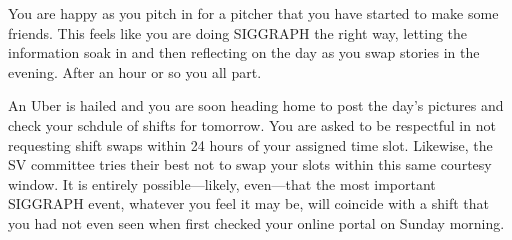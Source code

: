 \documentclass[../main.tex]{subfiles}
\begin{document}
You are happy as you pitch in for a pitcher that you have started to make some friends. This feels like you are doing SIGGRAPH the right way, letting the information soak in and then reflecting on the day as you swap stories in the evening. After an hour or so you all part.

An Uber is hailed and you are soon heading home to post the day's pictures and check your schdule of shifts for tomorrow. You are asked to be respectful in not requesting shift swaps within 24 hours of your assigned time slot. Likewise, the SV committee tries their best not to swap your slots within this same courtesy window. It is entirely possible---likely, even---that the most important SIGGRAPH event, whatever you feel it may be, will coincide with a shift that you had not even seen when first checked your online portal on Sunday morning.
\end{document}
